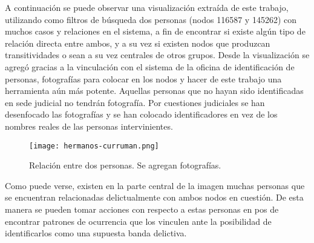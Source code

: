 A continuación se puede observar una visualización extraída de este trabajo, utilizando como filtros de búsqueda dos personas (nodos 116587 y 145262) con muchos casos y relaciones en el sistema, a fin de encontrar si existe algún tipo de relación directa entre ambos, y a su vez si existen nodos que produzcan transitividades o sean a su vez centrales de otros grupos.
Desde la visualización se agregó gracias a la vinculación con el sistema de la oficina de identificación de personas, fotografías para colocar en los nodos y hacer de este trabajo una herramienta aún más potente. Aquellas personas que no hayan sido identificadas en sede judicial no tendrán fotografía. Por cuestiones judiciales se han desenfocado las fotografías y se han colocado identificadores en vez de los nombres reales de las personas intervinientes.
\vspace{-10pt}
\begin{figure}
	\centering
	\texttt{[image: hermanos-curruman.png]}
	\caption{Relación entre dos personas. Se agregan fotografías.} 
	\label{fig:hermanos-curruman}
\end{figure}
\vspace{-10pt}
Como puede verse, existen en la parte central de la imagen muchas personas que se encuentran relacionadas delictualmente con ambos nodos en cuestión. De esta manera se pueden tomar acciones con respecto a estas personas en pos de encontrar patrones de ocurrencia que los vinculen ante la posibilidad de identificarlos como una supuesta banda delictiva. 
